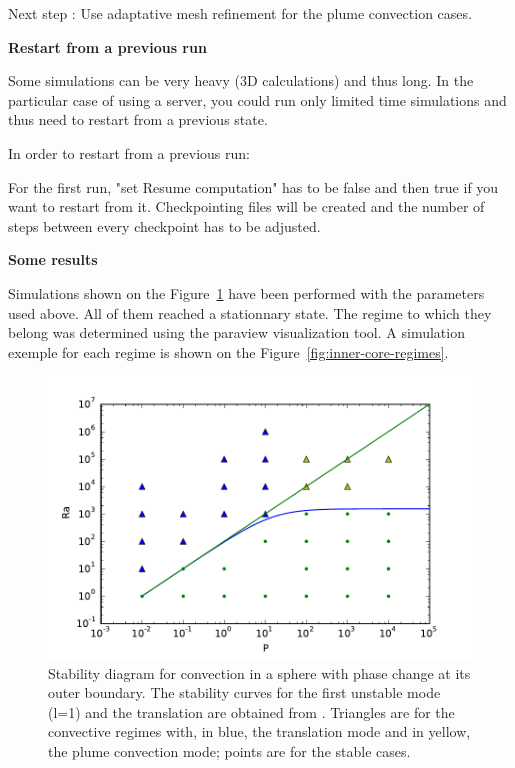 \documentclass{article}
\begin{document}
Next step : Use adaptative mesh refinement for the plume convection cases.
 
\vspace{0.2cm}
\textbf{Restart from a previous run}
\vspace{0.2cm}

Some simulations can be very heavy (3D calculations) and thus long. In the particular case of using a server, you could run only limited time simulations and thus need to restart from a previous state.

In order to restart from a previous run:

For the first run, "set Resume computation" has to be false and then true if you want to restart from it. Checkpointing files will be created and the number of steps between every checkpoint has to be adjusted.

\vspace{0.4cm}
\textbf{Some results}
\vspace{0.2cm}

Simulations shown on the Figure~\ref{fig:simulations} have been performed with the parameters used above. All of them reached a stationnary state. The regime to which they belong was determined using the paraview visualization tool. A simulation exemple for each regime is shown on the Figure~\ref{fig:inner-core-regimes}. 

\begin{figure}
    \begin{center}
    \includegraphics[width=0.6\linewidth]{cookbooks/inner_core_convection/simulations.pdf}
    \caption{Stability diagram for convection in a sphere with phase change at its outer boundary. The stability curves for the first unstable mode (l=1) and the translation are obtained from \cite{Deguen2013}. Triangles are for the convective regimes with, in blue, the translation mode and in yellow, the plume convection mode; points are for the stable cases.}
    \label{fig:simulations}
       \end{center}
\end{figure}
\end{document}
